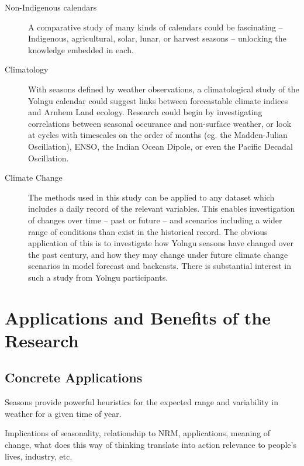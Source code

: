 \begin{description}
\item[Non-Indigenous calendars]
    A comparative study of many kinds of calendars could be fascinating --
    Indigenous, agricultural, solar, lunar, or harvest seasons -- unlocking
    the knowledge embedded in each.

\item[Climatology]
    With seasons defined by weather observations, a climatological study of the
    Yolngu calendar could suggest links between forecastable climate indices
    and Arnhem Land ecology.  Research could begin by investigating correlations
    between seasonal occurance and non-surface weather, or look at cycles with
    timescales on the order of months (eg. the Madden-Julian Oscillation), ENSO,
    the Indian Ocean Dipole, or even the Pacific Decadal Oscillation.

\item[Climate Change]
    The methods used in this study can be applied to any dataset which
    includes a daily record of the relevant variables.  This enables
    investigation of changes over time -- past or future -- and scenarios
    including a wider range of conditions than exist in the historical record.
    The obvious application of this is to investigate how Yolngu seasons have
    changed over the past century, and how they may change under future climate
    change scenarios in model forecast and backcasts.  There is substantial
    interest in such a study from Yolngu participants.
\end{description}



\section{Applications and Benefits of the Research}
\label{sec:applications-benefits}



\subsection{Concrete Applications}

Seasons provide powerful heuristics for the expected range and variability in
weather for a given time of year.

Implications of seasonality, relationship to NRM, applications, meaning of
change, what does this way of thinking translate into action
relevance to people's lives, industry, etc.

